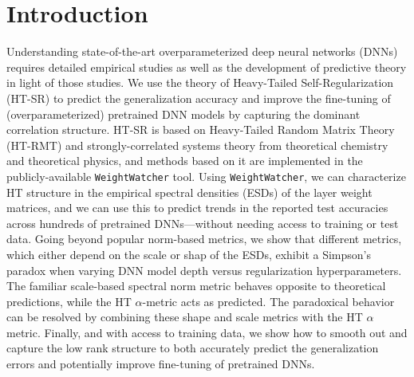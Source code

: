 \documentclass{article}
\begin{document}


\section*{Introduction}

Understanding state-of-the-art overparameterized deep neural networks (DNNs) requires detailed empirical studies as well as the development of predictive theory in light of those studies. 
We use the theory of Heavy-Tailed Self-Regularization (HT-SR) to predict the generalization accuracy and improve the fine-tuning of (overparameterized) pretrained DNN models by capturing the dominant correlation structure.
HT-SR is based on Heavy-Tailed Random Matrix Theory (HT-RMT) and strongly-correlated systems theory from theoretical chemistry and theoretical physics, and methods based on it are implemented in the publicly-available \texttt{WeightWatcher} tool.
Using \texttt{WeightWatcher}, we can characterize HT structure in the empirical spectral densities (ESDs) of the layer weight matrices, and we can use this to predict trends in the reported test accuracies across hundreds of pretrained DNNs---without needing access to training or test data.
Going beyond popular norm-based metrics, we show that different metrics, which either depend on the scale or shap of the ESDs, exhibit a Simpson's paradox when varying DNN model depth versus regularization hyperparameters.
The familiar scale-based spectral norm metric behaves opposite to theoretical predictions, while the HT $\alpha$-metric acts as predicted.
The paradoxical behavior  can be resolved by combining these shape and scale metrics with the HT $\hat{\alpha}$ metric.
Finally, and with access to training data, we show how to
smooth out and capture the low rank structure to both accurately
predict the generalization errors and potentially improve
fine-tuning of pretrained DNNs.
\end{document}
